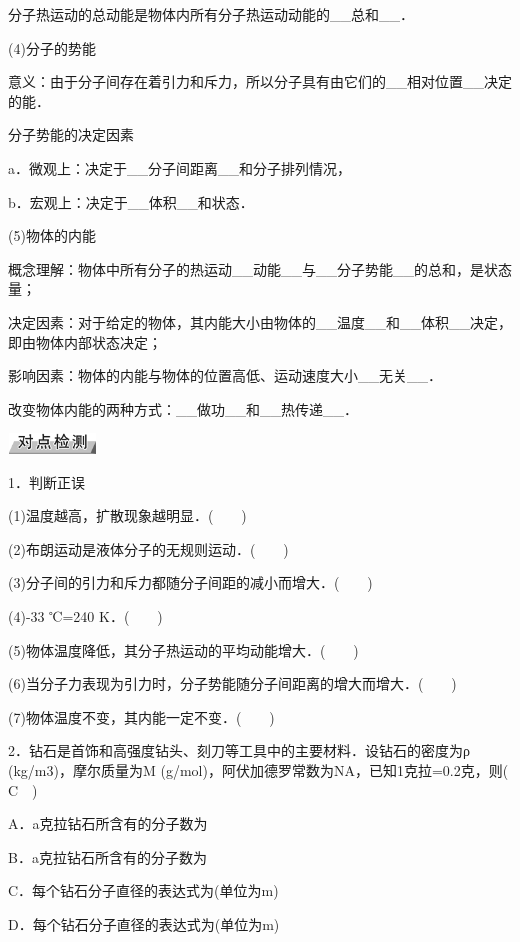 分子热运动的总动能是物体内所有分子热运动动能的\_\_总和\_\_．

(4)分子的势能

意义：由于分子间存在着引力和斥力，所以分子具有由它们的\_\_相对位置\_\_决定的能．

分子势能的决定因素

a．微观上：决定于\_\_分子间距离\_\_和分子排列情况，

b．宏观上：决定于\_\_体积\_\_和状态．

(5)物体的内能

概念理解：物体中所有分子的热运动\_\_动能\_\_与\_\_分子势能\_\_的总和，是状态量；

决定因素：对于给定的物体，其内能大小由物体的\_\_温度\_\_和\_\_体积\_\_决定，即由物体内部状态决定；

影响因素：物体的内能与物体的位置高低、运动速度大小\_\_无关\_\_．

改变物体内能的两种方式：\_\_做功\_\_和\_\_热传递\_\_．

\begin{center}\includegraphics[width=0.92431in,height=0.21667in]{media/image6.png}\end{center}
1．判断正误

(1)温度越高，扩散现象越明显．(　　)

(2)布朗运动是液体分子的无规则运动．(　　)

(3)分子间的引力和斥力都随分子间距的减小而增大．(　　)

(4)-33 ℃=240 K．(　　)

(5)物体温度降低，其分子热运动的平均动能增大．(　　)

(6)当分子力表现为引力时，分子势能随分子间距离的增大而增大．(　　)

(7)物体温度不变，其内能一定不变．(　　)

2．钻石是首饰和高强度钻头、刻刀等工具中的主要材料．设钻石的密度为ρ
(kg/m3)，摩尔质量为M
(g/mol)，阿伏加德罗常数为NA，已知1克拉=0.2克，则(　C　)

A．a克拉钻石所含有的分子数为

B．a克拉钻石所含有的分子数为

C．每个钻石分子直径的表达式为(单位为m)

D．每个钻石分子直径的表达式为(单位为m)

